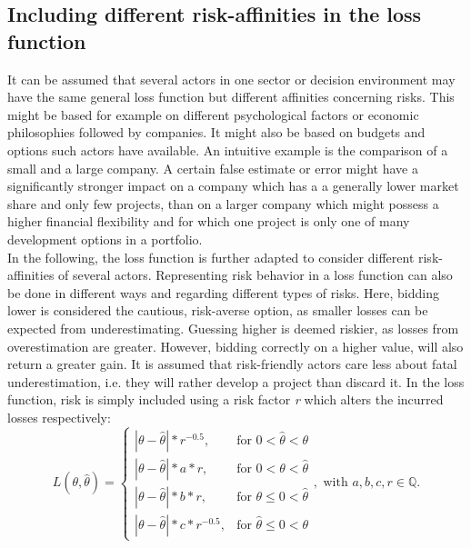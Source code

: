 		\subsection{Including different risk-affinities in the loss function}		
		It can be assumed that several actors in one sector or decision environment may have the same general loss function but different affinities concerning risks. This might be based for example on different psychological factors or economic philosophies followed by companies. It might also be based on budgets and options such actors have available. An intuitive example is the comparison of a small and a large company. A certain false estimate or error might have a significantly stronger impact on a company which has a a generally lower market share and only few projects, than on a larger company which might possess a higher financial flexibility and for which one project is only one of many development options in a portfolio.\\		
		In the following, the loss function is further adapted to consider different risk-affinities of several actors. Representing risk behavior in a loss function can also be done in different ways and regarding different types of risks. Here, bidding lower is considered the cautious, risk-averse option, as smaller losses can be expected from underestimating. Guessing higher is deemed riskier, as losses from overestimation are greater. However, bidding correctly on a higher value, will also return a greater gain. It is assumed that risk-friendly actors care less about fatal underestimation, i.e. they will rather develop a project than discard it. In the loss function, risk is simply included using a risk factor \textit{r} which alters the incurred losses respectively:
		\begin{equation}\label{eq:LFR_final}
		L(\theta,\hat{\theta}) =
		\begin{cases}
		|\theta - \hat{\theta}|*r^{-0.5}, & \text{for } 0<\hat{\theta}<\theta  \\
		|\theta-\hat{\theta}|*a*r, & \text{for } 0<\theta<\hat{\theta} \\
		|\theta-\hat{\theta}|*b*r, & \text{for } \theta\leq0<\hat{\theta} \\
		|\theta-\hat{\theta}|*c*r^{-0.5}, & \text{for } \hat{\theta}\leq0<\theta 
		\end{cases},
		\text{ with } a,b,c,r \in \mathbb{Q}.
		\end{equation}	
